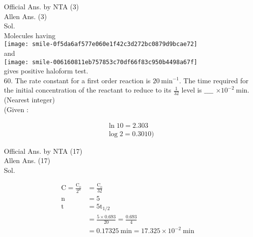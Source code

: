 \documentclass[10pt]{article}
\begin{document}
Official Ans. by NTA (3)\\
Allen Ans. (3)\\
Sol.\\
Molecules having\\
\texttt{[image: smile-0f5da6af577e060e1f42c3d272bc0879d9bcae72]}\\
and\\
\texttt{[image: smile-006160811eb757853c70df66f83c950b4498a67f]}\\
gives positive haloform test.\\
60. The rate constant for a first order reaction is \(20 \mathrm{~min}^{-1}\). The time required for the initial concentration of the reactant to reduce to its \(\frac{1}{32}\) level is \(\_\_\_\_\) \(\times 10^{-2} \mathrm{~min}\). (Nearest integer)\\
(Given :

\[
\begin{aligned}
& \ln 10=2.303 \\
& \log 2=0.3010)
\end{aligned}
\]

Official Ans. by NTA (17)\\
Allen Ans. (17)\\
Sol.

\[
\begin{aligned}
\mathrm{C}=\frac{\mathrm{C}_{\mathrm{o}}}{2^{\mathrm{n}}} & =\frac{\mathrm{C}_{\mathrm{o}}}{32} \\
\mathrm{n} & =5 \\
\mathrm{t} & =5 \mathrm{t}_{1 / 2} \\
& =\frac{5 \times 0.693}{20}=\frac{0.693}{4} \\
& =0.17325 \mathrm{~min}=17.325 \times 10^{-2} \mathrm{~min}
\end{aligned}
\]
\end{document}
